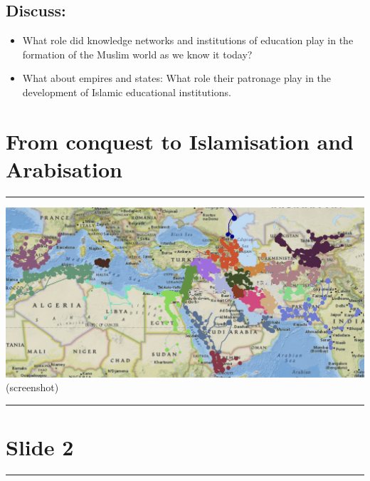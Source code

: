 \documentclass[
]{book}
\begin{document}
\hypertarget{discuss}{%
\subsection{Discuss:}\label{discuss}}

\begin{itemize}
\item
  What role did knowledge networks and institutions of education play in the formation of the Muslim world as we know it today?
\item
  What about empires and states: What role their patronage play in the development of Islamic educational institutions.
\end{itemize}

\hypertarget{from-conquest-to-islamisation-and-arabisation}{%
\section{From conquest to Islamisation and Arabisation}\label{from-conquest-to-islamisation-and-arabisation}}

\begin{center}\rule{0.5\linewidth}{0.5pt}\end{center}

\includegraphics{./files/map3.png} (screenshot)

\begin{center}\rule{0.5\linewidth}{0.5pt}\end{center}

\hypertarget{slide-2}{%
\section{Slide 2}\label{slide-2}}

\begin{center}\rule{0.5\linewidth}{0.5pt}\end{center}
\end{document}
